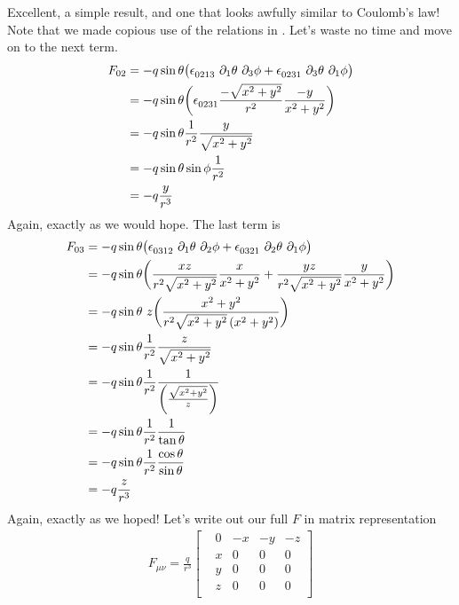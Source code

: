 %
Excellent, a simple result, and one that looks awfully similar to Coulomb's law! Note that we made copious use of the relations in \cite{Wiki:1}. Let's waste no time and move on to the next term.
%
\begin{align}
	F_{0 2} &= - q \sin{\theta} \big( \epsilon\indices{_{0213}} \ \partial_{1} \theta \ \partial_{3} \phi +  \epsilon\indices{_{0231}} \ \partial_{3} \theta \ \partial_{1} \phi \big)  \notag \\
	&= - q \sin{\theta} \bigg( \epsilon\indices{_{0231}} \frac{-\sqrt{x^2 + y^2}}{r^2} \frac{-y}{x^2 + y^2} \bigg)  \notag \\
	&= - q \sin{\theta} \frac{1}{r^2} \frac{y}{\sqrt{x^2 + y^2}}  \notag \\
	&= - q \sin{\theta} \sin{\phi} \frac{1}{r^2}  \notag \\
	&= - q \frac{y}{r^3}
\end{align} 
% 
Again, exactly as we would hope. The last term is 
%
\begin{align}
	F_{0 3} &= - q \sin{\theta} \big( \epsilon\indices{_{0312}} \ \partial_{1} \theta \ \partial_{2} \phi +  \epsilon\indices{_{0321}} \ \partial_{2} \theta \ \partial_{1} \phi \big)  \notag \\
	&= - q \sin{\theta} \bigg(\frac{xz}{r^2 \sqrt{x^2 + y^2}} \frac{x}{x^2 + y^2} + \frac{yz}{r^2 \sqrt{x^2 + y^2}} \frac{y}{x^2 + y^2}\bigg)  \notag \\
	&= - q \sin{\theta} \ z \bigg(\frac{x^2 + y^2}{r^2 \sqrt{x^2 + y^2} \left(x^2 + y^2\right)} \bigg)  \notag \\
	&= - q \sin{\theta} \frac{1}{r^2} \frac{z}{\sqrt{x^2 + y^2}}  \notag \\
	&= - q \sin{\theta} \frac{1}{r^2} \frac{1}{\left(\frac{\sqrt{x^2 + y^2}}{z}\right)}  \notag \\
	&= - q \sin{\theta} \frac{1}{r^2} \frac{1}{\tan{\theta}}  \notag \\
	&= - q \sin{\theta} \frac{1}{r^2} \frac{\cos{\theta}}{\sin{\theta}}  \notag \\
	&= - q \frac{z}{r^3}
\end{align} 
% 
Again, exactly as we hoped! Let's write out our full $F$ in matrix representation
%
\begin{align} \label{F-matrix}
	F_{\mu\nu} = \frac{q}{r^3} \begin{bmatrix}
		& 0 & -x  &-y & -z\\ 
		& x & 0 &0 &0 \\
		& y & 0 &0 &0 \\
		& z & 0 &0 &0 \\
	\end{bmatrix} 
\end{align}	

